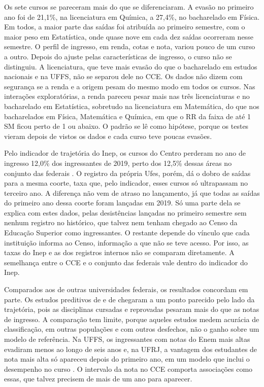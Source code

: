 \documentclass[12pt,a4paper]{article}
\begin{document}
Os sete cursos se pareceram mais do que se diferenciaram. A evasão no primeiro ano foi de 21,1\%, na licenciatura em Química, a 27,4\%, no bacharelado em Física. Em todos, a maior parte das saídas foi atribuída ao primeiro semestre, com o maior peso em Estatística, onde quase nove em cada dez saídas ocorreram nesse semestre. O perfil de ingresso, em renda, cotas e nota, variou pouco de um curso a outro. Depois do ajuste pelas características de ingresso, o curso não se distinguiu. A licenciatura, que teve mais evasão do que o bacharelado em estudos nacionais e na UFFS, não se separou dele no CCE. Os dados não dizem com segurança se a renda e a origem pesam do mesmo modo em todos os cursos. Nas interações exploratórias, a renda pareceu pesar mais nas três licenciaturas e no bacharelado em Estatística, sobretudo na licenciatura em Matemática, do que nos bacharelados em Física, Matemática e Química, em que o RR da faixa de até 1 SM ficou perto de 1 ou abaixo. O padrão se lê como hipótese, porque os testes vieram depois de vistos os dados e cada curso teve poucas evasões.

Pelo indicador de trajetória do Inep, os cursos do Centro perderam no ano de ingresso 12,0\% dos ingressantes de 2019, perto dos 12,5\% dessas áreas no conjunto das federais \citep{inep2025trajetoria}. O registro da própria Ufes, porém, dá o dobro de saídas para a mesma coorte, taxa que, pelo indicador, esses cursos só ultrapassam no terceiro ano. A diferença não vem de atraso no lançamento, já que todas as saídas do primeiro ano dessa coorte foram lançadas em 2019. Só uma parte dela se explica com estes dados, pelas desistências lançadas no primeiro semestre sem nenhum registro no histórico, que talvez nem tenham chegado ao Censo da Educação Superior como ingressantes. O restante depende do vínculo que cada instituição informa ao Censo, informação a que não se teve acesso. Por isso, as taxas do Inep e as dos registros internos não se comparam diretamente. A semelhança entre o CCE e o conjunto das federais vale dentro do indicador do Inep.

Comparados aos de outras universidades federais, os resultados concordam em parte. Os estudos preditivos de \citet{felizardoAnaliseDiscriminanteProbabilidade2023} e de \citet{salaberriMineracaoDadosEducacionais2024} chegaram a um ponto parecido pelo lado da trajetória, pois as disciplinas cursadas e reprovadas pesaram mais do que as notas de ingresso. A comparação tem limite, porque aqueles estudos medem acurácia de classificação, em outras populações e com outros desfechos, não o ganho sobre um modelo de referência. Na UFFS, os ingressantes com notas do Enem mais altas evadiram menos ao longo de seis anos \citep{nierotkaFatoresAssociadosEvasao2023} e, na UFRJ, a vantagem dos estudantes de nota mais alta só apareceu depois do primeiro ano, em um modelo que inclui o desempenho no curso \citep{klitzkeFATORESASSOCIADOSEVASAO2023}. O intervalo da nota no CCE comporta associações como essas, que talvez precisem de mais de um ano para aparecer.
\end{document}

